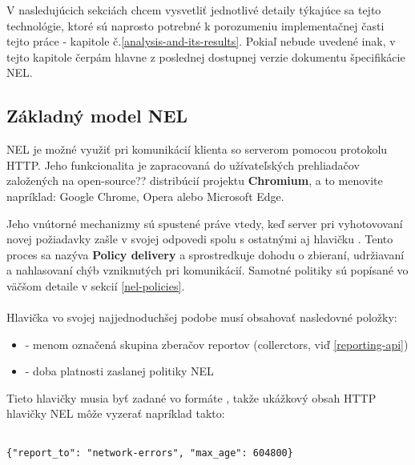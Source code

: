 V nasledujúcich sekciách chcem vysvetliť jednotlivé detaily týkajúce sa tejto technológie, ktoré sú naprosto potrebné k porozumeniu 
implementačnej časti tejto práce - kapitole č.\ref{analysis-and-its-results}. Pokiaľ nebude uvedené inak, v tejto kapitole čerpám hlavne 
z poslednej dostupnej verzie dokumentu špecifikácie NEL\cite{W3C-NEL}.

\subsection{Základný model NEL}

NEL je možné využiť pri komunikácií klienta so serverom pomocou protokolu HTTP. Jeho funkcionalita je zapracovaná do užívateľských 
prehliadačov založených na open-source?? distribúcií projektu \textbf{Chromium}, a to menovite napríklad: Google Chrome, Opera alebo 
Microsoft Edge. 

Jeho vnútorné mechanizmy sú spustené práve vtedy, keď server pri vyhotovovaní novej požiadavky zašle v svojej odpovedi spolu s ostatnými 
aj hlavičku . Tento proces sa nazýva \textbf{Policy delivery} a sprostredkuje dohodu o zbieraní, udržiavaní a nahlasovaní chýb 
vzniknutých pri komunikácií. Samotné politiky sú popísané vo väčšom detaile v sekcií \ref{nel-policies}.
\\
\\
Hlavička  vo svojej najjednoduchšej podobe musí obsahovať nasledovné položky: 

\begin{itemize}
    \item {} - menom označená skupina zberačov reportov (collerctors, viď \ref{reporting-api}) 
    \item {} - doba platnosti zaslanej politiky NEL
\end{itemize}

Tieto hlavičky musia byť zadané vo formáte , takže ukážkový obsah HTTP hlavičky NEL môže vyzerať 
napríklad takto:

\begin{lstlisting}[caption={Ukážka obsahu najjednoduchšej/minimálnej HTTP hlavičky NEL. Akékoľvek chyby budú hlásené do skupiny 
    \code{network-errors} po dobu platnosti tejto politiky, ktorá bola nastavená na 7 dní (604 800 / 60s / 60min / 24h)}]

{"report_to": "network-errors", "max_age": 604800}

\end{lstlisting}


